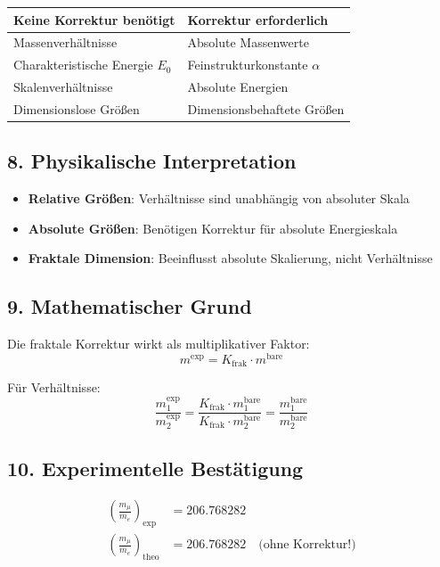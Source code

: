 \begin{tabular}{p{}p{}}
	\textbf{Keine Korrektur benötigt} & \textbf{Korrektur erforderlich} \\
	\hline
	Massenverhältnisse & Absolute Massenwerte \\
	Charakteristische Energie $E_0$ & Feinstrukturkonstante $\alpha$ \\
	Skalenverhältnisse & Absolute Energien \\
	Dimensionslose Größen & Dimensionsbehaftete Größen \\
\end{tabular}

\subsection{8. Physikalische Interpretation}

\begin{itemize}
	\item \textbf{Relative Größen}: Verhältnisse sind unabhängig von absoluter Skala
	\item \textbf{Absolute Größen}: Benötigen Korrektur für absolute Energieskala
	\item \textbf{Fraktale Dimension}: Beeinflusst absolute Skalierung, nicht Verhältnisse
\end{itemize}

\subsection{9. Mathematischer Grund}

Die fraktale Korrektur wirkt als multiplikativer Faktor:
\[
m^{\text{exp}} = K_{\text{frak}} \cdot m^{\text{bare}}
\]

Für Verhältnisse:
\[
\frac{m_1^{\text{exp}}}{m_2^{\text{exp}}} = \frac{K_{\text{frak}} \cdot m_1^{\text{bare}}}{K_{\text{frak}} \cdot m_2^{\text{bare}}} = \frac{m_1^{\text{bare}}}{m_2^{\text{bare}}}
\]

\subsection{10. Experimentelle Bestätigung}

\begin{align*}
	\left(\frac{m_\mu}{m_e}\right)_{\text{exp}} &= 206.768282 \\
	\left(\frac{m_\mu}{m_e}\right)_{\text{theo}} &= 206.768282 \quad \text{(ohne Korrektur!)}
\end{align*}

